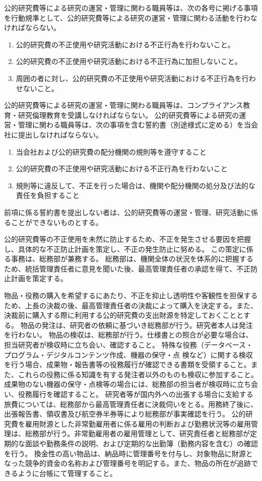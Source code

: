 \documentclass[10pt,a4paper,uplatex]{jsarticle}
\begin{document}
公的研究費等による研究の運営・管理に関わる職員等は、次の各号に掲げる事項を行動規準として、公的研究費等による研究の運営・管理に関わる活動を行わなければならない。
\begin{enumerate}
	\item 公的研究費の不正使用や研究活動における不正行為を行わないこと。
	\item 公的研究費の不正使用や研究活動における不正行為に加担しないこと。
	\item 周囲の者に対し、公的研究費の不正使用や研究活動における不正行為を行わせないこと。
\end{enumerate}
\term 公的研究費等による研究の運営・管理に関わる職員等は、コンプライアンス教育・研究倫理教育を受講しなければならない。
\term 公的研究費等による研究の運営・管理に関わる職員等は、次の事項を含む誓約書（別途様式に定める）を当会社に提出しなければならない。
\begin{enumerate}
	\item 当会社および公的研究費の配分機関の規則等を遵守すること
	\item 公的研究費の不正使用や研究活動における不正行為を行わないこと
	\item 規則等に違反して、不正を行った場合は、機関や配分機関の処分及び法的な責任を負担すること 
\end{enumerate}
\term 前項に係る誓約書を提出しない者は、公的研究費等の運営・管理、研究活動に係ることができないものとする。

公的研究費等の不正使用を未然に防止するため、不正を発生させる要因を把握し、具体的な不正防止計画を策定し、不正の発生防止に努める。
\term この策定に係る事務は、総務部が兼務する。
\term 総務部は、機関全体の状況を体系的に把握するため、統括管理責任者に意見を聞いた後、最高管理責任者の承認を得て、不正防止計画を策定する。

物品・役務の購入を希望するにあたり、不正を抑止し透明性や客観性を担保するため、上長の決裁の後、最高管理責任者の決裁によって購入を決定する。また、決裁前に購入する際に利用する公的研究費の支出財源を特定しておくこととする。
\term 物品の発注は、研究者の依頼に基づいき総務部が行う。研究者本人は発注を行わない。 
\term 物品の検収は、総務部が行う。仕様書との照合が必要な場合は、担当研究者が検収時に立ち会い、確認すること。
\term 特殊な役務（データベース・プログラム・デジタルコンテンツ作成、機器の保守・点
検など）に関する検収を行う場合、成果物・報告書等の役務履行が確認できる書類を受領すること。また、これらの役務に係る知識を有する発注者以外のものも検収に参加すること。成果物のない機器の保守・点検等の場合には、総務部の担当者が検収時に立ち会い、役務履行を確認すること。
\term 研究者等が国内外への出張する場合に支給する旅費については、総務部から最高管理責任者に決裁伺いをとる。用務終了後に、出張報告書、領収書及び航空券半券等により総務部が事実確認を行う。
\term 公的研究費を雇用財源とした非常勤雇用者に係る雇用の判断および勤務状況等の雇用管理は、総務部が行う。非常勤雇用者の雇用管理として、研究責任者と総務部が定期的な面談や勤務条件の説明、および定期的な出勤簿（勤務内容を含む）の確認を行う。
\term 換金性の高い物品は、納品時に管理番号を付与し、対象物品に財源となった競争的資金の名称および管理番号を明記する。また、物品の所在が追跡できるように台帳にて管理すること。
\end{document}

